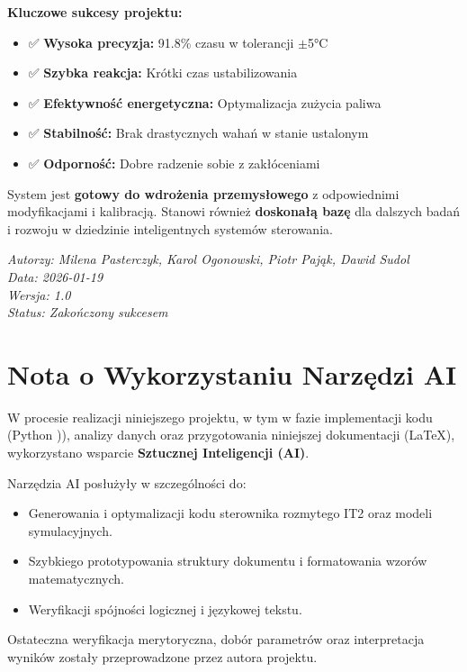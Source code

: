 \documentclass[12pt,a4paper]{article}
\newcommand{\myauthor}{Milena Pasterczyk, Karol Ogonowski, Piotr Pająk, Dawid Sudol}
\begin{document}
\textbf{Kluczowe sukcesy projektu:}
\begin{itemize}
    \item ✅ \textbf{Wysoka precyzja:} 91.8\% czasu w tolerancji $\pm$5°C
    \item ✅ \textbf{Szybka reakcja:} Krótki czas ustabilizowania
    \item ✅ \textbf{Efektywność energetyczna:} Optymalizacja zużycia paliwa
    \item ✅ \textbf{Stabilność:} Brak drastycznych wahań w stanie ustalonym
    \item ✅ \textbf{Odporność:} Dobre radzenie sobie z zakłóceniami
\end{itemize}

System jest \textbf{gotowy do wdrożenia przemysłowego} z odpowiednimi modyfikacjami i kalibracją. Stanowi również \textbf{doskonałą bazę} dla dalszych badań i rozwoju w dziedzinie inteligentnych systemów sterowania.

\vspace{1cm}

\noindent
\textit{Autorzy: \myauthor}\\
\textit{Data: 2026-01-19}\\
\textit{Wersja: 1.0}\\
\textit{Status: Zakończony sukcesem}

\section{Nota o Wykorzystaniu Narzędzi AI}

W procesie realizacji niniejszego projektu, w tym w fazie implementacji kodu (Python \cite{python-docs})), analizy danych \cite{numpy-guide} oraz przygotowania niniejszej dokumentacji (LaTeX), wykorzystano wsparcie \textbf{Sztucznej Inteligencji (AI)}. 

Narzędzia AI posłużyły w szczególności do:
\begin{itemize}
    \item Generowania i optymalizacji kodu sterownika rozmytego IT2 oraz modeli symulacyjnych.
    \item Szybkiego prototypowania struktury dokumentu i formatowania wzorów matematycznych.
    \item Weryfikacji spójności logicznej i językowej tekstu.
\end{itemize}

Ostateczna weryfikacja merytoryczna, dobór parametrów oraz interpretacja wyników zostały przeprowadzone przez autora projektu.
\end{document}
